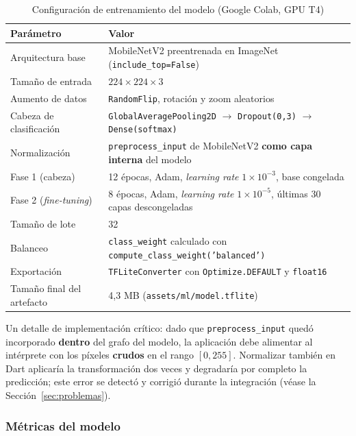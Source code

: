 \documentclass[12pt,a4paper]{article}
\begin{document}
\begin{table}[H]
\centering
\caption{Configuración de entrenamiento del modelo (Google Colab, GPU T4)}
\label{tab:hiperparametros}
\renewcommand{\arraystretch}{1.25}
\begin{tabular}{p{5.2cm} p{8.3cm}}
\toprule
\bfseries Parámetro & \bfseries Valor \\
\midrule
Arquitectura base & MobileNetV2 preentrenada en ImageNet (\texttt{include\_top=False}) \\
Tamaño de entrada & $224 \times 224 \times 3$ \\
Aumento de datos & \texttt{RandomFlip}, rotación y zoom aleatorios \\
Cabeza de clasificación & \texttt{GlobalAveragePooling2D} $\rightarrow$ \texttt{Dropout(0{,}3)} $\rightarrow$ \texttt{Dense(softmax)} \\
Normalización & \texttt{preprocess\_input} de MobileNetV2 \textbf{como capa interna} del modelo \\
Fase 1 (cabeza) & 12 épocas, Adam, \textit{learning rate} $1\times10^{-3}$, base congelada \\
Fase 2 (\textit{fine-tuning}) & 8 épocas, Adam, \textit{learning rate} $1\times10^{-5}$, últimas 30 capas descongeladas \\
Tamaño de lote & 32 \\
Balanceo & \texttt{class\_weight} calculado con \texttt{compute\_class\_weight('balanced')} \\
Exportación & \texttt{TFLiteConverter} con \texttt{Optimize.DEFAULT} y \texttt{float16} \\
Tamaño final del artefacto & 4{,}3 MB (\texttt{assets/ml/model.tflite}) \\
\bottomrule
\end{tabular}
\end{table}

Un detalle de implementación crítico: dado que \texttt{preprocess\_input} quedó
incorporado \textbf{dentro} del grafo del modelo, la aplicación debe alimentar
al intérprete con los píxeles \textbf{crudos} en el rango $[0,255]$. Normalizar
también en Dart aplicaría la transformación dos veces y degradaría por completo
la predicción; este error se detectó y corrigió durante la integración (véase la
Sección~\ref{sec:problemas}).

\subsubsection{Métricas del modelo}
\end{document}
